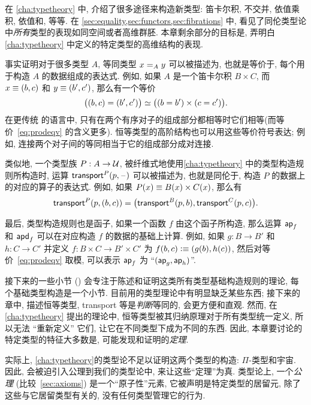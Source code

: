 在 \cref{cha:typetheory} 中, 介绍了很多途径来构造新类型: 笛卡尔积, 不交并, 依值乘积, 依值和, 等等.
在 \cref{sec:equality,sec:functors,sec:fibrations} 中, 看见了同伦类型论中\emph{所有}类型的表现如同空间或者高维群胚.
本章剩余部分的目标是, 弄明白 \cref{cha:typetheory} 中定义的特定类型的高维结构的表现.

事实证明对于很多类型 $A$, 等同类型 $\id[A]xy$ 可以被描述为, 也就是等价于, 每个用于构造 $A$ 的数据组成的表达式.
例如, 如果 $A$ 是一个笛卡尔积 $B\times C$, 而 $x\jdeq (b,c)$ 和 $y\jdeq(b',c')$, 那么有一个等价
\begin{equation}\label{eq:prodeqv}
  \eqv{\big((b,c)=(b',c')\big)}{\big((b=b')\times (c=c')\big)}.
\end{equation}
在更传统 的语言中, 只有在两个有序对子的组成部分都相等时它们相等(而等价~\eqref{eq:prodeqv} 的含义更多).
恒等类型的高阶结构也可以用这些等价符号表达;
例如, 连接两个对子间的等同相当于它的组成部分成对连接.

类似地, 一个类型族 $P:A\to\type$, 被纤维式地使用\cref{cha:typetheory} 中的类型构造规则所构造时, 运算 $\transfib{P}{p}{\blank}$ 可以被描述为, 也就是同伦于, 构造 $P$ 的数据上的对应的算子的表达式.
例如, 如果 $P(x) \jdeq B(x)\times C(x)$, 那么有
\[\transfib{P}{p}{(b,c)} = \big(\transfib{B}{p}{b},\transfib{C}{p}{c}\big).\]

最后, 类型构造规则也是函子, 如果一个函数 $f$ 由这个函子所构造, 那么运算 $\apfunc f$ 和 $\apdfunc f$ 可以在对应构造 $f$ 的数据的基础上计算.
例如, 如果 $g:B\to B'$ 和 $h:C\to C'$ 并定义 $f:B\times C \to B'\times C'$ 为 $f(b,c)\defeq (g(b),h(c))$, 然后对等价~\eqref{eq:prodeqv} 取模, 可以表示 $\apfunc f$ 为 ``$(\apfunc g,\apfunc h)$''.

接下来的一些小节 () 会专注于陈述和证明这类所有类型基础构造规则的理论, 每个基础类型构造是一个小节.
目前用的类型理论中有明显缺乏某些东西;
接下来的章中, 描述恒等类型, transport 等是\emph{判断}等同的, 会更方便和直观.
然而, 在 \cref{cha:typetheory} 提出的理论中, 恒等类型被其归纳原理对于所有类型统一定义, 所以无法 ``重新定义'' 它们, 让它在不同类型下成为不同的东西.
因此, 本章要讨论的特定类型的特征大多数是, 可能发现和证明的\emph{定理}.

实际上, \cref{cha:typetheory}的类型论不足以证明这两个类型的构造: $\Pi$-类型和宇宙.
因此, 会被迫引入公理到我们的类型论中, 来让这些``定理''为真.
类型论上, 一个\emph{公理} (比较~\cref{sec:axioms}) 是一个``原子性''元素, 它被声明是特定类型的居留元, 除了这些与它居留类型有关的, 没有任何类型管理它的行为.
%

